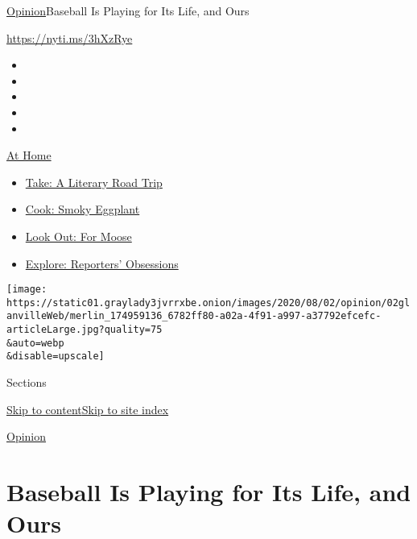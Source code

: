 \href{/section/opinion}{Opinion}\textbar{}Baseball Is Playing for Its
Life, and Ours

\url{https://nyti.ms/3hXzRye}

\begin{itemize}
\item
\item
\item
\item
\item
\end{itemize}

\href{https://www.nytimes3xbfgragh.onion/spotlight/at-home?action=click\&pgtype=Article\&state=default\&region=TOP_BANNER\&context=at_home_menu}{At
Home}

\begin{itemize}
\tightlist
\item
  \href{https://www.nytimes3xbfgragh.onion/2020/07/28/books/time-for-a-literary-road-trip.html?action=click\&pgtype=Article\&state=default\&region=TOP_BANNER\&context=at_home_menu}{Take:
  A Literary Road Trip}
\item
  \href{https://www.nytimes3xbfgragh.onion/2020/07/29/magazine/bored-with-your-home-cooking-some-smoky-eggplant-will-fix-that.html?action=click\&pgtype=Article\&state=default\&region=TOP_BANNER\&context=at_home_menu}{Cook:
  Smoky Eggplant}
\item
  \href{https://www.nytimes3xbfgragh.onion/2020/07/27/travel/moose-michigan-isle-royale.html?action=click\&pgtype=Article\&state=default\&region=TOP_BANNER\&context=at_home_menu}{Look
  Out: For Moose}
\item
  \href{https://www.nytimes3xbfgragh.onion/interactive/2020/at-home/even-more-reporters-editors-diaries-lists-recommendations.html?action=click\&pgtype=Article\&state=default\&region=TOP_BANNER\&context=at_home_menu}{Explore:
  Reporters' Obsessions}
\end{itemize}

\texttt{[image: https://static01.graylady3jvrrxbe.onion/images/2020/08/02/opinion/02glanvilleWeb/merlin\_174959136\_6782ff80-a02a-4f91-a997-a37792efcefc-articleLarge.jpg?quality=75\\\&auto=webp\\\&disable=upscale]}

Sections

\protect\hyperlink{site-content}{Skip to
content}\protect\hyperlink{site-index}{Skip to site index}

\href{/section/opinion}{Opinion}

\hypertarget{baseball-is-playing-for-its-life-and-ours}{%
\section{Baseball Is Playing for Its Life, and
Ours}\label{baseball-is-playing-for-its-life-and-ours}}

